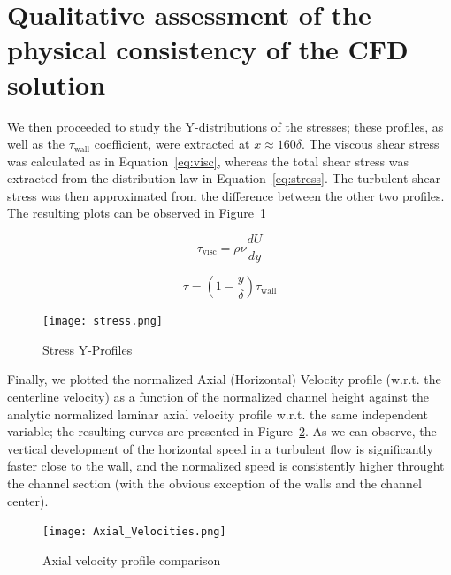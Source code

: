 \documentclass[12pt]{article}
\begin{document}
\section{Qualitative assessment of the physical consistency of the CFD solution} \label{sec:qualitative}

        We then proceeded to study the Y-distributions of the stresses; these profiles, as well as the \( \tau_{\text{wall}} \) coefficient, were extracted at \(x \approx 160 \delta\). The viscous shear stress was calculated as in Equation~\ref{eq:visc}, whereas the total shear stress was extracted from the distribution law in Equation~\ref{eq:stress}. The turbulent shear stress was then approximated from the difference between the other two profiles. The resulting plots can be observed in Figure~\ref{fig:stress}

        \begin{equation} \label{eq:visc}
                \tau_{\text{visc}} = \rho \nu \frac{dU}{dy}
        \end{equation}

        \begin{equation} \label{eq:stress}
                \tau = (1 - \frac{y}{\delta}) \tau_{\text{wall}}
        \end{equation}

        \begin{figure}[ht!]
                \centering
                \texttt{[image: stress.png]}
                \caption{Stress Y-Profiles}
                \label{fig:stress}
        \end{figure}

        Finally, we plotted the normalized Axial (Horizontal) Velocity profile (w.r.t. the centerline velocity) as a function of the normalized channel height against the analytic normalized laminar axial velocity profile w.r.t. the same independent variable; the resulting curves are presented in Figure~\ref{fig:axialV}. As we can observe, the vertical development of the horizontal speed in a turbulent flow is significantly faster close to the wall, and the normalized speed is consistently higher throught the channel section (with the obvious exception of the walls and the channel center).

        \begin{figure}
                \centering
                \texttt{[image: Axial\_Velocities.png]}
                \caption{Axial velocity profile comparison}
                \label{fig:axialV}
        \end{figure}
\end{document}
